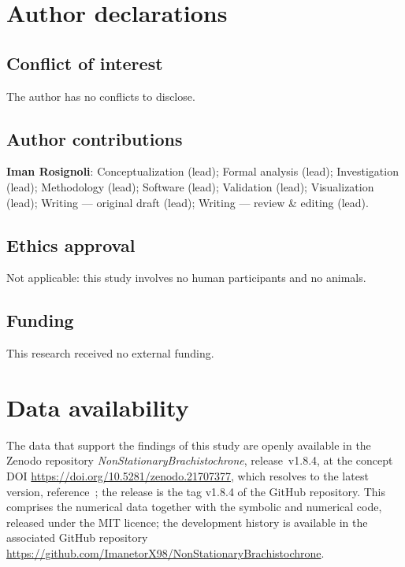 \documentclass[12pt]{iopart}
\theoremstyle{plain}
\theoremstyle{definition}
\theoremstyle{plain}
\theoremstyle{remark}
\begin{document}
\section*{Author declarations}

\subsection*{Conflict of interest}
The author has no conflicts to disclose.

\subsection*{Author contributions}
\textbf{Iman Rosignoli}: Conceptualization (lead); Formal analysis (lead); Investigation
(lead); Methodology (lead); Software (lead); Validation (lead); Visualization (lead);
Writing --- original draft (lead); Writing --- review \& editing (lead).

\subsection*{Ethics approval}
Not applicable: this study involves no human participants and no animals.

\subsection*{Funding}
This research received no external funding.

\section*{Data availability}
The data that support the findings of this study are openly available in the Zenodo
repository \emph{NonStationaryBrachistochrone}, release~v1.8.4, at the concept DOI
\url{https://doi.org/10.5281/zenodo.21707377}, which resolves to the latest version,
reference~\cite{Rosignoli2026CodeJMP}; the release is the tag v1.8.4 of the GitHub
repository. This
comprises the numerical data together with the symbolic and numerical code, released under
the MIT licence; the development history is available in the associated GitHub repository
\url{https://github.com/ImanetorX98/NonStationaryBrachistochrone}.
\end{document}
